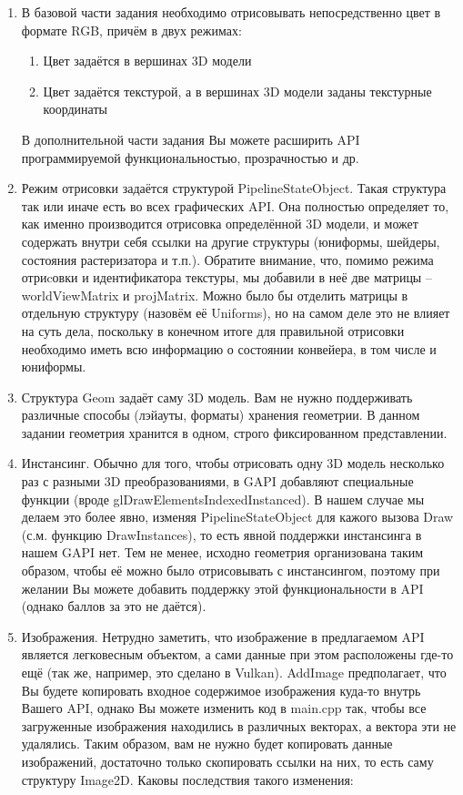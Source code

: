 \documentclass[12pt,subf,href,colorlinks=true]{article}
\begin{document}
\begin{enumerate}
  \item В базовой части задания необходимо отрисовывать непосредственно цвет в формате RGB, причём в двух режимах:
  \begin{enumerate}
    \item Цвет задаётся в вершинах 3D модели
    \item Цвет задаётся текстурой, а в вершинах 3D модели заданы текстурные координаты
  \end{enumerate}
  В дополнительной части задания Вы можете расширить API программируемой функциональностью, прозрачностью и др.

  \item Режим отрисовки задаётся структурой PipelineStateObject. Такая структура так или иначе есть во всех графических API. Она полностью определяет то, как именно производится отрисовка определённой 3D модели, и может содержать внутри себя ссылки на другие структуры (юниформы, шейдеры, состояния растеризатора и т.п.). Обратите внимание, что, помимо режима отриcовки и идентификатора текстуры, мы добавили в неё две матрицы -- worldViewMatrix и projMatrix. Можно было бы отделить матрицы в отдельную структуру (назовём её Uniforms), но на самом деле это не влияет на суть дела, поскольку в конечном итоге для правильной отрисовки необходимо иметь всю информацию о состоянии конвейера, в том числе и юниформы.

  \item Структура Geom задаёт саму 3D модель. Вам не нужно поддерживать различные способы (лэйауты, форматы) хранения геометрии. В данном задании геометрия хранится в одном, строго фиксированном представлении.

  \item Инстансинг. Обычно для того, чтобы отрисовать одну 3D модель несколько раз с разными 3D преобразованиями, в GAPI добавляют специальные функции (вроде glDrawElementsIndexedInstanced). В нашем случае мы делаем это более явно, изменяя PipelineStateObject для кажого вызова Draw (с.м. функцию DrawInstances), то есть явной поддержки инстансинга в нашем GAPI нет. Тем не менее, исходно геометрия организована таким образом, чтобы её можно было отрисовывать с инстансингом, поэтому при желании Вы можете добавить поддержку этой функциональности в API (однако баллов за это не даётся).

  \item Изображения. Нетрудно заметить, что изображение в предлагаемом API является легковесным объектом, а сами данные при этом расположены где-то ещё (так же, например, это сделано в Vulkan). AddImage предполагает, что Вы будете копировать входное содержимое изображения куда-то внутрь Вашего API, однако Вы можете изменить код в main.cpp так, чтобы все загруженные изображения находились в различных векторах, а вектора эти не удалялись. Таким образом, вам не нужно будет копировать данные изображений, достаточно только скопировать ссылки на них, то есть саму структуру Image2D. Каковы последствия такого изменения:


\end{enumerate}
\end{document}
